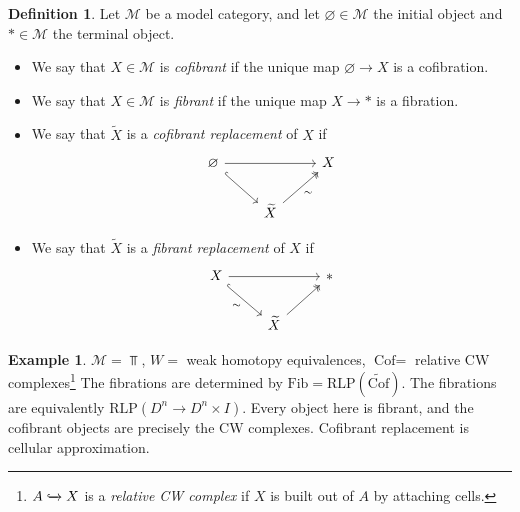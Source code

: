 \documentclass[12pt]{amsart}
\let\til\widetilde
\theoremstyle{definition}
\newtheorem{definition}[theorem]{Definition}
\newtheorem{example}[theorem]{Example}
\providecommand{\Cof}{\text{Cof}}
\providecommand{\Fib}{\text{Fib}}
\providecommand{\RLP}{\text{RLP}}
\let\emptyset\varnothing
\begin{document}
\begin{definition} Let $\mathcal{M}$ be a model category, and let $\emptyset \in \mathcal{M}$ the initial object and $\ast\in \mathcal{M}$ the terminal object. 

\begin{itemize}
    \item We say that $X\in \mathcal{M}$ is \textit{cofibrant} if the unique map $\emptyset \to X$ is a cofibration. 
    \item We say that $X\in \mathcal{M}$ is \textit{fibrant} if the unique map $X \to \ast$ is a fibration.
    \item We say that $\til{X}$ is a \textit{cofibrant replacement} of $X$ if
\[ \begin{tikzcd}
    \emptyset\ar[rr]\ar[dr,hook] &  & X\\
     & \til{X}\ar[ur,two heads,"\sim" below right] & 
\end{tikzcd} \]
    \item We say that $\til{X}$ is a \textit{fibrant replacement} of $X$ if
\[ \begin{tikzcd}
    X\ar[rr]\ar[dr,hook,"\sim" below left] &  & \ast\\
     & \til{X}\ar[ur,two heads] & 
\end{tikzcd} \]
\end{itemize}
\end{definition}

\begin{example} $\mathcal{M} = \Top$, $W=$ weak homotopy equivalences, $\Cof=$ relative CW complexes\footnote{$A\xhookrightarrow{} X$ is a \textit{relative CW complex} if $X$ is built out of $A$ by attaching cells.} The fibrations are determined by $\Fib = \RLP(\widetilde{\Cof})$. The fibrations are equivalently $\RLP(D^n \to D^n \times I)$. Every object here is fibrant, and the cofibrant objects are precisely the CW complexes. Cofibrant replacement is cellular approximation.
\end{example}








\newpage

{}
\end{document}
